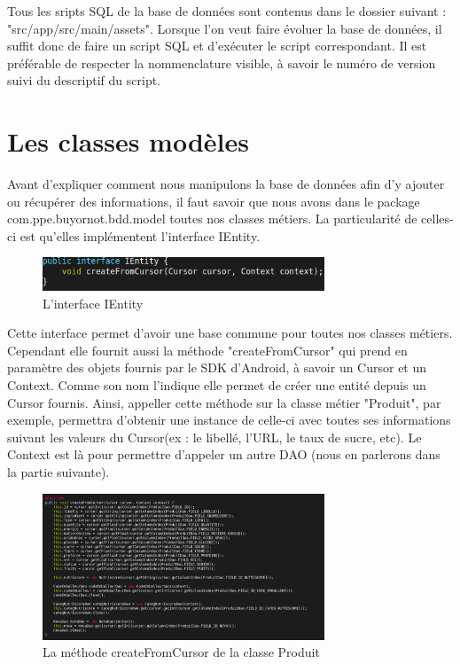 \documentclass[report]{BetterDocument}
\newcommand{\bdd}{base de données}
\begin{document}
			Tous les sripts SQL de la \bdd{} sont contenus dans le dossier suivant : "src/app/src/main/assets". Lorsque l'on veut faire évoluer la \bdd{}, il suffit donc de faire un script SQL et d'exécuter le script correspondant. Il est préférable de respecter la nommenclature visible, à savoir le numéro de version suivi du descriptif du script.

		\section{Les classes modèles}

			Avant d'expliquer comment nous manipulons la \bdd{} afin d'y ajouter ou récupérer des informations, il faut savoir que nous avons dans le package com.ppe.buyornot.bdd.model toutes nos classes métiers. La particularité de celles-ci est qu'elles implémentent l'interface IEntity.

			\begin{figure}[H]
				\centering\includegraphics[width=0.75\textwidth, keepaspectratio]{img/bdd/ientity.png}
				\caption{L'interface IEntity}
			\end{figure}

			Cette interface permet d'avoir une base commune pour toutes nos classes métiers. Cependant elle fournit aussi la méthode "createFromCursor" qui prend en paramètre des objets fournis par le SDK d'Android, à savoir un Cursor et un Context. Comme son nom l'indique elle permet de créer une entité depuis un Cursor fournis. Ainsi, appeller cette méthode sur la classe métier "Produit", par exemple, permettra d'obtenir une instance de celle-ci avec toutes ses informations suivant les valeurs du Cursor(ex : le libellé, l'URL, le taux de sucre, etc). Le Context est là pour permettre d'appeler un autre DAO (nous en parlerons dans la partie suivante).

			\begin{figure}[H]
				\centering\includegraphics[width=0.75\textwidth, keepaspectratio]{img/bdd/createfromcursor_produit.png}
				\caption{La méthode createFromCursor de la classe Produit}
			\end{figure}
\end{document}
